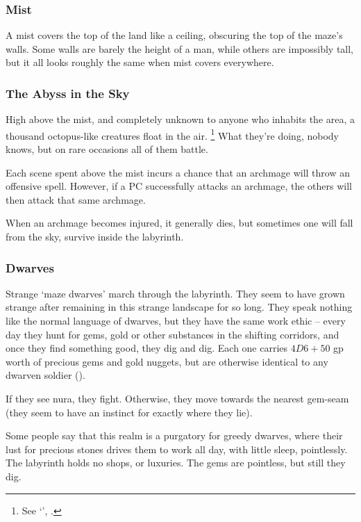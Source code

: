 \begin{multicols}{2}
\subsubsection{Mist}

A mist covers the top of the land like a ceiling, obscuring the top of the maze's walls.
Some walls are barely the height of a man, while others are impossibly tall, but it all looks roughly the same when mist covers everywhere.

\subsubsection{The Abyss in the Sky}

High above the mist, and completely unknown to anyone who inhabits the area, a thousand octopus-like creatures float in the air.
\footnote{See `', .}
What they're doing, nobody knows, but on rare occasions all of them battle.

Each scene spent above the mist incurs a chance that an archmage will throw an offensive spell.
However, if a PC successfully attacks an archmage, the others will then attack that same archmage.

When an archmage becomes injured, it generally dies, but sometimes one will fall from the sky, survive inside the labyrinth.

\subsubsection{Dwarves}

Strange `maze dwarves' march through the labyrinth.
They seem to have grown strange after remaining in this strange landscape for so long.
They speak nothing like the normal language of dwarves, but they have the same work ethic -- every day they hunt for gems, gold or other substances in the shifting corridors, and once they find something good, they dig and dig.
Each one carries $4D6 + 50$ gp worth of precious gems and gold nuggets, but are otherwise identical to any dwarven soldier ().

If they see nura, they fight.
Otherwise, they move towards the nearest gem-seam (they seem to have an instinct for exactly where they lie).

Some people say that this realm is a purgatory for greedy dwarves, where their lust for precious stones drives them to work all day, with little sleep, pointlessly.
The labyrinth holds no shops, or luxuries.
The gems are pointless, but still they dig.


\end{multicols}
